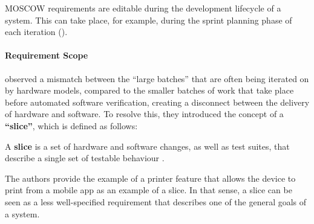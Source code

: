 \documentclass[a4paper,nobib,justified,final]{tufte-book}
\begin{document}
\acs{MOSCOW} requirements are editable during the development lifecycle of a system. This can take place, for example, during the sprint planning phase of each iteration ().


\paragraph{Requirement Scope}

\NextCitationOffset{1.2cm}%
\citeauthor{radekaWhenAgileGets2022} \autocite{radekaWhenAgileGets2022,iberleAgileGetsPhysical2022} observed a mismatch between the ``large batches'' that are often being iterated on by hardware models, compared to the smaller batches of work that take place before automated software verification, creating a disconnect between the delivery of hardware and software. To resolve this, they introduced the concept of a \textbf{``slice''}, which is defined as follows:
\begin{definition}[Slice]
	A \textbf{slice} is a set of hardware and software changes, as well as test suites, that describe a single set of testable behaviour \cite{radekaWhenAgileGets2022}.
	\label{def:slice}
\end{definition}
The authors provide the example of a printer feature that allows the device to print from a mobile app as an example of a slice. In that sense, a slice can be seen as a less well-specified requirement that describes one of the general goals of a system.
\end{document}
